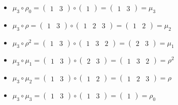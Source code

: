 \documentclass{article}
\begin{document}
\begin{itemize}
        \item $\mu_3\circ\rho_0 =\begin{pmatrix}1&3\end{pmatrix}\circ\begin{pmatrix}1\end{pmatrix}=\begin{pmatrix}1&3\end{pmatrix}=\mu_3$
        \item $\mu_3\circ\rho =\begin{pmatrix}1&3\end{pmatrix}\circ\begin{pmatrix}1&2&3\end{pmatrix}=\begin{pmatrix}1&2\end{pmatrix}=\mu_2$
        \item $\mu_3\circ\rho^2 =\begin{pmatrix}1&3\end{pmatrix}\circ\begin{pmatrix}1&3&2\end{pmatrix}=\begin{pmatrix}2&3\end{pmatrix}=\mu_1$
        \item $\mu_3\circ\mu_1 =\begin{pmatrix}1&3\end{pmatrix}\circ\begin{pmatrix}2&3\end{pmatrix}=\begin{pmatrix}1&3&2\end{pmatrix}=\rho^2$
        \item $\mu_3\circ\mu_2 =\begin{pmatrix}1&3\end{pmatrix}\circ\begin{pmatrix}1&2\end{pmatrix}=\begin{pmatrix}1&2&3\end{pmatrix}=\rho$
        \item $\mu_3\circ\mu_3 =\begin{pmatrix}1&3\end{pmatrix}\circ\begin{pmatrix}1&3\end{pmatrix}=\begin{pmatrix}1\end{pmatrix}=\rho_0$
    \end{itemize}
\end{document}
